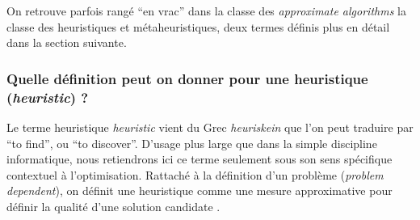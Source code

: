 On retrouve parfois rangé \enquote{en vrac} dans la classe des \textit{approximate algorithms} la classe des heuristiques et métaheuristiques, deux termes définis plus en détail dans la section suivante.


\subsubsection{Quelle définition peut on donner pour une heuristique (\textit{heuristic}) ? }
\label{sssec:heuristique}

Le terme heuristique \textit{heuristic} vient du Grec \textit{heuriskein} que l'on peut traduire par \foreignquote{english}{to find}, ou \foreignquote{english}{to discover}. D'usage plus large que dans la simple discipline informatique, nous retiendrons ici ce terme seulement sous son sens spécifique contextuel à l'optimisation. Rattaché à la définition d'un problème (\textit{problem dependent}), on définit une heuristique comme une mesure approximative pour définir la qualité d'une solution candidate \autocite[34]{Weise2011}.

